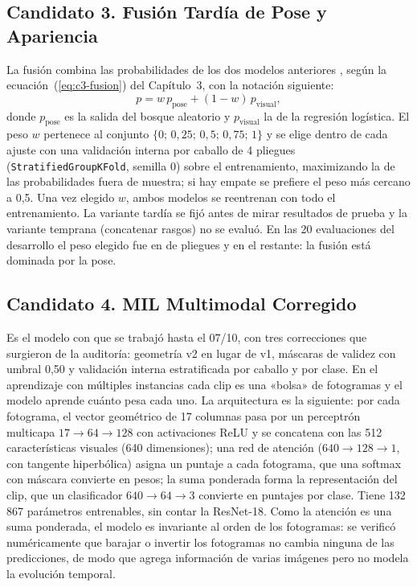 \subsection{Candidato 3. Fusión Tardía de Pose y Apariencia}
La fusión combina las probabilidades de los dos modelos anteriores \parencite[fusión de clasificadores;][]{kittler1998}, según la ecuación~(\ref{eq:c3-fusion}) del Capítulo~3, con la notación siguiente:
\[
p = w\,p_{\mathrm{pose}} + (1-w)\,p_{\mathrm{visual}},
\]
donde $p_{\mathrm{pose}}$ es la salida del bosque aleatorio y $p_{\mathrm{visual}}$ la de la regresión logística. El peso $w$ pertenece al conjunto $\{0;\,0{,}25;\,0{,}5;\,0{,}75;\,1\}$ y se elige dentro de cada ajuste con una validación interna por caballo de 4 pliegues (\texttt{Stratified\-Group\-KFold}, semilla 0) sobre el entrenamiento, maximizando la \fmacro{} de las probabilidades fuera de muestra; si hay empate se prefiere el peso más cercano a 0,5. Una vez elegido $w$, ambos modelos se reentrenan con todo el entrenamiento. La variante tardía se fijó antes de mirar resultados de prueba y la variante temprana (concatenar rasgos) no se evaluó. En las 20 evaluaciones del desarrollo el peso elegido fue \PesoPose{} en \PesoFoldsA{} de \PesoFoldsTotal{} pliegues y \PesoPoseUno{} en el restante: la fusión está dominada por la pose.

\subsection{Candidato 4. MIL Multimodal Corregido}
Es el modelo con que se trabajó hasta el 07/10, con tres correcciones que surgieron de la auditoría: geometría v2 en lugar de v1, máscaras de validez con umbral 0,50 y validación interna estratificada por caballo y por clase. En el aprendizaje con múltiples instancias \parencite{ilse2018} cada clip es una «bolsa» de \Fotogramas{} fotogramas y el modelo aprende cuánto pesa cada uno. La arquitectura es la siguiente: por cada fotograma, el vector geométrico de 17 columnas pasa por un perceptrón multicapa $17 \rightarrow 64 \rightarrow 128$ con activaciones ReLU y se concatena con las 512 características visuales (640 dimensiones); una red de atención ($640 \rightarrow 128 \rightarrow 1$, con tangente hiperbólica) asigna un puntaje a cada fotograma, que una softmax con máscara convierte en pesos; la suma ponderada forma la representación del clip, que un clasificador $640 \rightarrow 64 \rightarrow 3$ convierte en puntajes por clase. Tiene 132\,867 parámetros entrenables, sin contar la ResNet-18. Como la atención es una suma ponderada, el modelo es invariante al orden de los fotogramas: se verificó numéricamente que barajar o invertir los \Fotogramas{} fotogramas no cambia ninguna de las \ClipsTotal{} predicciones, de modo que agrega información de varias imágenes pero no modela la evolución temporal.

